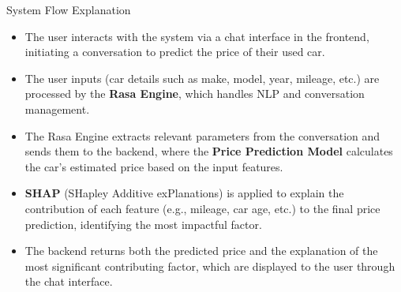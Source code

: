 \documentclass{beamer}
\begin{document}
\begin{frame}{System Flow Explanation}
    \begin{itemize}
        \item The user interacts with the system via a chat interface in the frontend, initiating a conversation to predict the price of their used car.
        \item The user inputs (car details such as make, model, year, mileage, etc.) are processed by the \textbf{Rasa Engine}, which handles NLP and conversation management.
        \item The Rasa Engine extracts relevant parameters from the conversation and sends them to the backend, where the \textbf{Price Prediction Model} calculates the car's estimated price based on the input features.
        \item \textbf{SHAP} (SHapley Additive exPlanations) is applied to explain the contribution of each feature (e.g., mileage, car age, etc.) to the final price prediction, identifying the most impactful factor.
        \item The backend returns both the predicted price and the explanation of the most significant contributing factor, which are displayed to the user through the chat interface.
    \end{itemize}
\end{frame}
\end{document}

